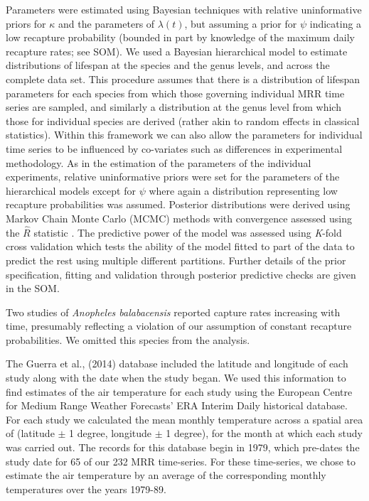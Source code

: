 \documentclass[]{article}
\begin{document}
Parameters were estimated using Bayesian techniques with relative
uninformative priors for $\kappa$ and the parameters of
$\lambda(t)$, but assuming a prior for $\psi$ indicating a low
recapture probability (bounded in part by knowledge of the maximum daily
recapture rates; see SOM). We used a Bayesian hierarchical model to estimate
distributions of lifespan at the species and the genus levels, and
across the complete data set. This procedure assumes that there is a
distribution of lifespan parameters for each species from which those
governing individual MRR time series are sampled, and similarly a
distribution at the genus level from which those for individual species
are derived (rather akin to random effects in classical statistics).
Within this framework we can also allow the parameters for individual
time series to be influenced by co-variates such as differences in
experimental methodology. As in the estimation of the parameters of the
individual experiments, relative uninformative priors were set for the
parameters of the hierarchical models except for $\psi$ where again a
distribution representing low recapture probabilities was assumed.
Posterior distributions were derived using Markov Chain Monte Carlo
(MCMC) methods with convergence assessed using the \(\hat{R}\) statistic
\citep{gelman1992inference}. The predictive power of the model was assessed
using \emph{K}-fold cross validation which tests the ability of the
model fitted to part of the data to predict the rest using multiple
different partitions. Further details of the prior specification,
fitting and validation through posterior predictive checks \citep{lambert2018student} are given in
the SOM.

Two studies of \emph{Anopheles balabacensis} reported capture rates
increasing with time, presumably reflecting a violation of our
assumption of constant recapture probabilities. We omitted this species
from the analysis.

The Guerra et al., (2014) database included the latitude and longitude of each
study along with the date when the study began. We used this information to find
estimates of the air temperature for each study using the European Centre for Medium
Range Weather Forecasts' ERA Interim Daily historical database. For each
study we calculated the mean monthly temperature across a spatial area
of (latitude $\pm$ 1 degree, longitude $\pm$ 1 degree), for the month at which
each study was carried out. The records for this database begin in 1979,
which pre-dates the study date for 65 of our 232 MRR time-series. For
these time-series, we chose to estimate the air temperature by an
average of the corresponding monthly temperatures over the years
1979-89.
\end{document}
